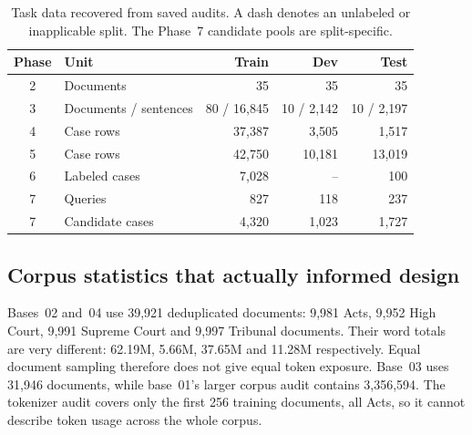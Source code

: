 \begin{table}[H]
\centering\small
\caption{Task data recovered from saved audits. A dash denotes an unlabeled or inapplicable split. The Phase~7 candidate pools are split-specific.}
\label{tab:data}
\begin{tabular}{clrrr}
\toprule
Phase & Unit & Train & Dev & Test\\
\midrule
2 & Documents & 35 & 35 & 35\\
3 & Documents / sentences & 80 / 16,845 & 10 / 2,142 & 10 / 2,197\\
4 & Case rows & 37,387 & 3,505 & 1,517\\
5 & Case rows & 42,750 & 10,181 & 13,019\\
6 & Labeled cases & 7,028 & -- & 100\\
7 & Queries & 827 & 118 & 237\\
7 & Candidate cases & 4,320 & 1,023 & 1,727\\
\bottomrule
\end{tabular}
\end{table}

\subsection{Corpus statistics that actually informed design}
Bases~02 and~04 use 39,921 deduplicated documents: 9,981 Acts, 9,952 High Court, 9,991 Supreme Court and 9,997 Tribunal documents. Their word totals are very different: 62.19M, 5.66M, 37.65M and 11.28M respectively. Equal document sampling therefore does not give equal token exposure. Base~03 uses 31,946 documents, while base~01's larger corpus audit contains 3,356,594. The tokenizer audit covers only the first 256 training documents, all Acts, so it cannot describe token usage across the whole corpus.
